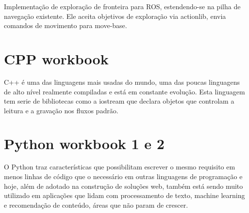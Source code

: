 Implementação de exploração de fronteira para ROS, estendendo-se na pilha de navegação existente. Ele aceita objetivos de exploração via actionlib, envia comandos de movimento para move-base.\cite{WikiROS}
 \section{CPP workbook}
 C++ é uma das linguagens mais usadas do mundo, uma das poucas linguagens de alto nível realmente compiladas e está em constante evolução.
 Esta linguagem tem serie de bibliotecas como a iostream que declara objetos que controlam a leitura e a gravação nos fluxos padrão. 
 \section{Python workbook 1 e 2}
 O Python traz características que possibilitam escrever o mesmo requisito em menos linhas de código que o necessário em outras linguagens de programação e hoje, além de adotado na construção de soluções web, também está sendo muito utilizado em aplicações que lidam com processamento de texto, machine learning e recomendação de conteúdo, áreas que não param de crescer.\cite{Python}






